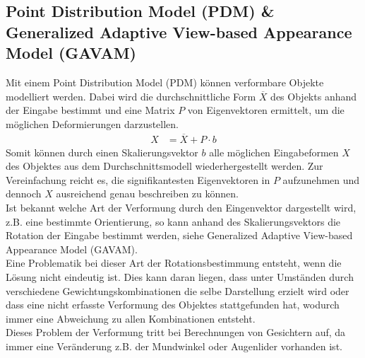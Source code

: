\subsection{Point Distribution Model (PDM) \& Generalized Adaptive View-based Appearance Model (GAVAM)}
Mit einem Point Distribution Model (PDM) können verformbare Objekte modelliert werden. Dabei wird die durchschnittliche Form $\overline{X}$ des Objekts anhand der Eingabe bestimmt und eine Matrix $P$ von Eigenvektoren ermittelt, um die möglichen Deformierungen darzustellen.
\begin{align*}
X &= \overline{X}+P\cdot b
\end{align*}
Somit können durch einen Skalierungsvektor $b$ alle möglichen Eingabeformen $X$ des Objektes aus dem Durchschnittsmodell wiederhergestellt werden. Zur Vereinfachung reicht es, die signifikantesten Eigenvektoren in $P$ aufzunehmen und dennoch $X$ ausreichend genau beschreiben zu können.\\
Ist bekannt welche Art der Verformung durch den Eingenvektor dargestellt wird, z.B. eine bestimmte Orientierung, so kann anhand des Skalierungsvektors die Rotation der Eingabe bestimmt werden, siehe Generalized Adaptive View-based Appearance Model (GAVAM).\\
Eine Problematik bei dieser Art der Rotationsbestimmung entsteht, wenn die Lösung nicht eindeutig ist. Dies kann daran liegen, dass unter Umständen durch verschiedene Gewichtungskombinationen die selbe Darstellung erzielt wird oder dass eine nicht erfasste Verformung des Objektes stattgefunden hat, wodurch immer eine Abweichung zu allen Kombinationen entsteht.\\
Dieses Problem der Verformung tritt bei Berechnungen von Gesichtern auf, da immer eine Veränderung z.B. der Mundwinkel oder Augenlider vorhanden ist.
\cite{pdf_PDM}\cite{pdf_GAVAM}\cite{wiki_PDM}